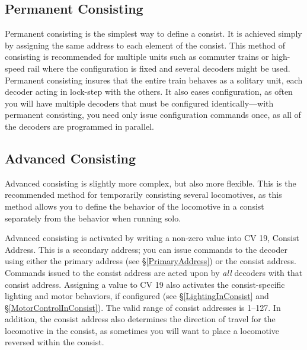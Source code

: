 \documentclass[12pt,letterpaper,draft]{memoir} %
\begin{document}
\subsection{Permanent Consisting}
Permanent consisting is the simplest way to define a consist. It is achieved simply by assigning the same address to each element of the consist. This method of consisting is recommended for multiple units such as commuter trains or high-speed rail where the configuration is fixed and several decoders might be used. Permanent consisting insures that the entire train behaves as a solitary unit, each decoder acting in lock-step with the others. It also eases configuration, as often you will have multiple decoders that must be configured identically---with permanent consisting, you need only issue configuration commands once, as all of the decoders are programmed in parallel.

\subsection{Advanced Consisting}
\label{AdvancedConsisting}
Advanced consisting is slightly more complex, but also more flexible. This is the recommended method for temporarily consisting several locomotives, as this method allows you to define the behavior of the locomotive in a consist separately from the behavior when running solo. 

Advanced consisting is activated by writing a non-zero value into CV 19, Consist Address. This is a secondary address; you can issue commands to the decoder using either the primary address (see \S\ref{PrimaryAddress}) or the consist address. Commands issued to the consist address are acted upon by \textit{all} decoders with that consist address. Assigning a value to CV 19 also activates the consist-specific lighting and motor behaviors, if configured (see \S\ref{LightingInConsist} and \S\ref{MotorControlInConsist}). The valid range of consist addresses is 1--127. In addition, the consist address also determines the direction of travel for the locomotive in the consist, as sometimes you will want to place a locomotive reversed within the consist.
\end{document}

